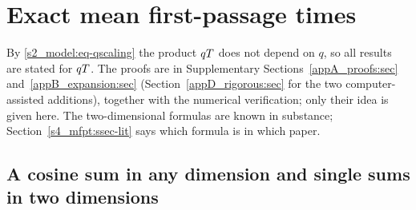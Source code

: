 \section{Exact mean first-passage times}\label{s4_mfpt:sec}

By \eqref{s2_model:eq-qscaling} the product $qT$ does not depend on $q$, so all results are stated for $qT$. The
proofs are in Supplementary Sections~\ref{appA_proofs:sec} and~\ref{appB_expansion:sec} (Section~\ref{appD_rigorous:sec}
for the two computer-assisted additions), together with the numerical verification; only their idea is given here.
The two-dimensional formulas are known in substance; Section~\ref{s4_mfpt:ssec-lit} says which formula is in which
paper.

\subsection{A cosine sum in any dimension and single sums in two dimensions}\label{s4_mfpt:ssec-cosine}

